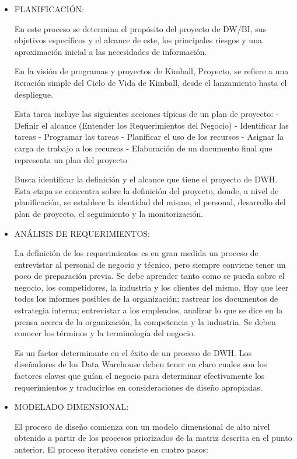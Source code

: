 \documentclass[preprint,12pt]{elsarticle}
\begin{document}
			\begin{itemize}

				\item PLANIFICACIÓN:
				
				En este proceso se determina el propósito del proyecto de DW/BI, sus objetivos específicos y el alcance de este, los principales riesgos y una aproximación inicial a las necesidades de información.

En la visión de programas y proyectos de Kimball, Proyecto, se refiere a una iteración simple del Ciclo de Vida de Kimball, desde el lanzamiento hasta el despliegue.

 Esta tarea incluye las siguientes acciones típicas de un plan de proyecto:
- Definir el alcance (Entender los Requerimientos del Negocio)
- Identificar las tareas
- Programar las tareas
- Planificar el uso de los recursos
- Asignar la carga de trabajo a los recursos
- Elaboración de un documento final que representa un plan del proyecto

Busca identificar la definición y el alcance que tiene el proyecto de DWH. Esta etapa se concentra sobre la definición del proyecto, donde, a nivel de planificación, se establece la identidad del mismo, el personal, desarrollo del plan de proyecto, el seguimiento y la monitorización.


				\item ANÁLISIS DE REQUERIMIENTOS: 
				
				 La definición de los requerimientos es en gran medida un proceso de entrevistar al personal de negocio y técnico, pero siempre conviene tener un poco de preparación previa. Se debe aprender tanto como se pueda sobre el negocio, los competidores, la industria y los clientes del mismo. Hay que leer todos los informes posibles de la organización; rastrear los documentos de estrategia interna; entrevistar a los empleados, analizar lo que se dice en la prensa acerca de la organización, la competencia y la industria. Se deben conocer los términos y la terminología del negocio.

Es un factor determinante en el éxito de un proceso de DWH. Los diseñadores de los Data Warehouse deben tener en claro cuales son los factores claves que guían el negocio para determinar efectivamente los requerimientos y traducirlos en consideraciones de diseño apropiadas.

				\item MODELADO DIMENSIONAL: 
				
				El proceso de diseño comienza con un modelo dimensional de alto nivel obtenido a partir de los procesos priorizados de la matriz descrita en el punto anterior. El proceso iterativo consiste en cuatro pasos: 


\end{itemize}
\end{document}
